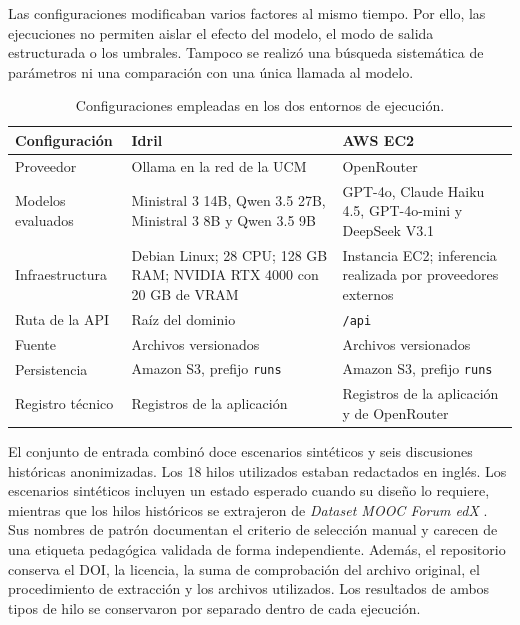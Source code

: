 Las configuraciones modificaban varios factores al mismo tiempo. Por ello, las ejecuciones no permiten aislar el efecto del modelo, el modo de salida estructurada o los umbrales. Tampoco se realizó una búsqueda sistemática de parámetros ni una comparación con una única llamada al modelo.

\begin{table}[htbp]
\centering
\small
\renewcommand{\arraystretch}{1.16}
\begin{tabularx}{\textwidth}{@{}Z{3.1cm}YY@{}}
\toprule
\textbf{Configuración} & \textbf{Idril} & \textbf{AWS EC2} \\
\midrule
Proveedor & Ollama en la red de la UCM & OpenRouter \\
Modelos evaluados & Ministral 3 14B, Qwen 3.5 27B, Ministral 3 8B y Qwen 3.5 9B & GPT-4o, Claude Haiku 4.5, GPT-4o-mini y DeepSeek V3.1 \\
Infraestructura & Debian Linux; 28 CPU; 128 GB RAM; NVIDIA RTX 4000 con 20 GB de VRAM & Instancia EC2; inferencia realizada por proveedores externos \\
Ruta de la API & Raíz del dominio & \texttt{/api} \\
Fuente & Archivos versionados & Archivos versionados \\
Persistencia & Amazon S3, prefijo \texttt{runs} & Amazon S3, prefijo \texttt{runs} \\
Registro técnico & Registros de la aplicación & Registros de la aplicación y de OpenRouter \\
\bottomrule
\end{tabularx}
\caption{Configuraciones empleadas en los dos entornos de ejecución.}
\label{tab:configuracion-experimentos}
\end{table}

El conjunto de entrada combinó doce escenarios sintéticos y seis discusiones históricas anonimizadas. Los 18 hilos utilizados estaban redactados en inglés. Los escenarios sintéticos incluyen un estado esperado cuando su diseño lo requiere, mientras que los hilos históricos se extrajeron de \textit{Dataset MOOC Forum edX} \parencite{AlarioHoyos2021Dataset}. Sus nombres de patrón documentan el criterio de selección manual y carecen de una etiqueta pedagógica validada de forma independiente. Además, el repositorio conserva el DOI, la licencia, la suma de comprobación del archivo original, el procedimiento de extracción y los archivos utilizados. Los resultados de ambos tipos de hilo se conservaron por separado dentro de cada ejecución.

